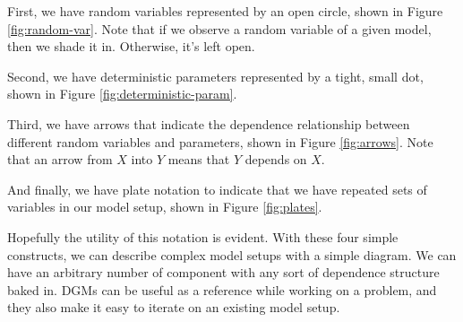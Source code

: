 First, we have random variables represented by an open circle, shown in Figure \ref{fig:random-var}. Note that if we observe a random variable of a given model, then we shade it in. Otherwise, it's left open.

Second, we have deterministic parameters represented by a tight, small dot, shown in Figure \ref{fig:deterministic-param}.

Third, we have arrows that indicate the dependence relationship between different random variables and parameters, shown in Figure \ref{fig:arrows}. Note that an arrow from $X$ into $Y$ means that $Y$ depends on $X$.

And finally, we have plate notation to indicate that we have repeated sets of variables in our model setup, shown in Figure \ref{fig:plates}.

Hopefully the utility of this notation is evident. With these four simple constructs, we can describe complex model setups with a simple diagram. We can have an arbitrary number of component with any sort of dependence structure baked in. DGMs can be useful as a reference while working on a problem, and they also make it easy to iterate on an existing model setup.

